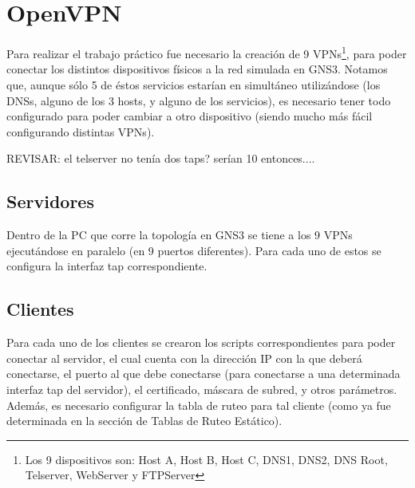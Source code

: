 \section{OpenVPN}
Para realizar el trabajo práctico fue necesario la creación de 9 VPNs\footnote{Los 9 dispositivos son: Host A, Host B, Host C, DNS1, DNS2, DNS Root, Telserver, WebServer y FTPServer}, para poder conectar los distintos dispositivos físicos a la red simulada en GNS3. Notamos que, aunque sólo 5 de éstos servicios estarían en simultáneo utilizándose (los DNSs, alguno de los 3 hosts, y alguno de los servicios), es necesario tener todo configurado para poder cambiar a otro dispositivo (siendo mucho más fácil configurando distintas VPNs).

REVISAR: el telserver no tenía dos taps? serían 10 entonces....

\subsection{Servidores}
Dentro de la PC que corre la topología en GNS3 se tiene a los 9 VPNs ejecutándose en paralelo (en 9 puertos diferentes). Para cada uno de estos se configura la interfaz tap correspondiente. 

\subsection{Clientes}
Para cada uno de los clientes se crearon los scripts correspondientes para poder conectar al servidor, el cual cuenta con la dirección IP con la que deberá conectarse, el puerto al que debe conectarse (para conectarse a una determinada interfaz tap del servidor), el certificado, máscara de subred, y otros parámetros. Además, es necesario configurar la tabla de ruteo para tal cliente (como ya fue determinada en la sección de Tablas de Ruteo Estático).